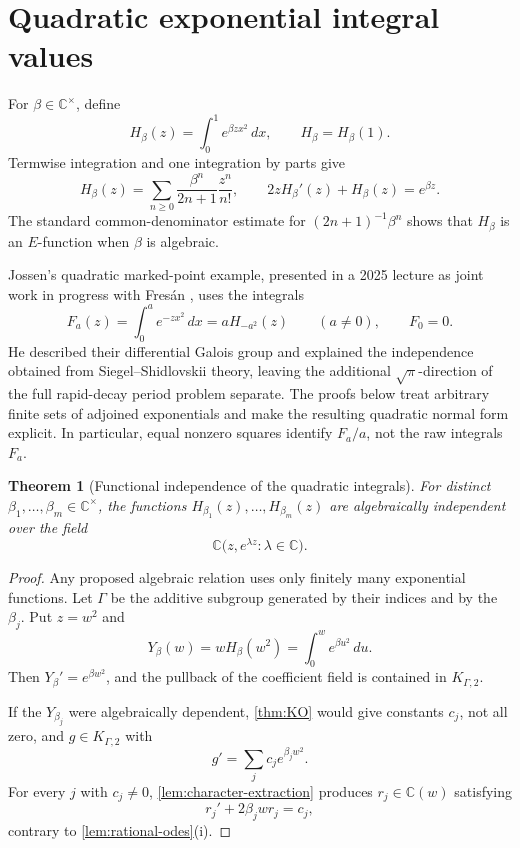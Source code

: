 \documentclass[11pt]{article}
\numberwithin{equation}{section}
\newtheorem{theorem}{Theorem}[section]
\theoremstyle{definition}
\theoremstyle{remark}
\newcommand{\C}{\mathbb C}
\begin{document}
\section{Quadratic exponential integral values}
\label{sec:quadratic}

For $\beta\in\C^\times$, define
\begin{equation}\label{eq:Hbeta}
  H_\beta(z)=\int_0^1e^{\beta z x^2}\,dx,
  \qquad H_\beta=H_\beta(1).
\end{equation}
Termwise integration and one integration by parts give
\begin{equation}\label{eq:H-series-ode}
  H_\beta(z)=\sum_{n\ge0}\frac{\beta^n}{2n+1}\frac{z^n}{n!},
  \qquad
  2zH_\beta'(z)+H_\beta(z)=e^{\beta z}.
\end{equation}
The standard common-denominator estimate for $(2n+1)^{-1}\beta^n$ shows that
$H_\beta$ is an $E$-function when $\beta$ is algebraic.

Jossen's quadratic marked-point example, presented in a 2025 lecture as
joint work in progress with Fres\'an \cite{Jossen2025}, uses the integrals
\[
  F_a(z)=\int_0^a e^{-zx^2}\,dx=aH_{-a^2}(z)\qquad(a\ne0),
  \qquad F_0=0.
\]
He described their differential Galois group and explained the independence
obtained from Siegel--Shidlovskii theory, leaving the additional
$\sqrt\pi$-direction of the full rapid-decay period problem separate.
The proofs below treat arbitrary finite sets of adjoined exponentials and
make the resulting quadratic normal form explicit.  In particular, equal
nonzero squares identify $F_a/a$, not the raw integrals $F_a$.

\begin{theorem}[Functional independence of the quadratic integrals]
\label{thm:H-functional}
For distinct $\beta_1,\ldots,\beta_m\in\C^\times$, the functions
$H_{\beta_1}(z),\ldots,H_{\beta_m}(z)$ are algebraically independent over
the field
\[
  \C\bigl(z,e^{\lambda z}:\lambda\in\C\bigr).
\]
\end{theorem}

\begin{proof}
Any proposed algebraic relation uses only finitely many exponential
functions.  Let $\Gamma$ be the additive subgroup generated by their indices
and by the $\beta_j$.  Put $z=w^2$ and
\[
  Y_\beta(w)=wH_\beta(w^2)=\int_0^w e^{\beta u^2}\,du.
\]
Then $Y_\beta'=e^{\beta w^2}$, and the pullback of the coefficient field is
contained in $K_{\Gamma,2}$.

If the $Y_{\beta_j}$ were algebraically dependent, \cref{thm:KO} would give
constants $c_j$, not all zero, and $g\in K_{\Gamma,2}$ with
\[
  g'=\sum_jc_je^{\beta_jw^2}.
\]
For every $j$ with $c_j\ne0$, \cref{lem:character-extraction} produces
$r_j\in\C(w)$ satisfying
\[
  r_j'+2\beta_jwr_j=c_j,
\]
contrary to \cref{lem:rational-odes}(i).
\end{proof}
\end{document}
